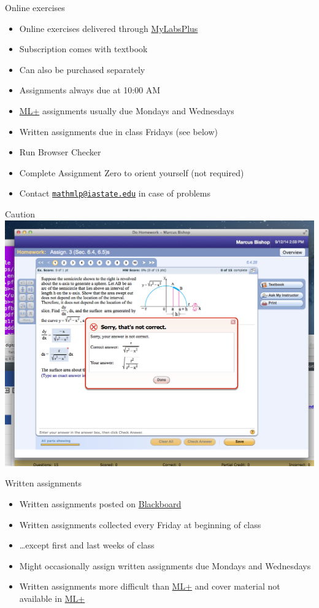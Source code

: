 \documentclass[xcolor=dvipsnames]{beamer}
\theoremstyle{definition}
\begin{document}
\begin{frame}{Online exercises}
\begin{itemize}
\item Online exercises delivered through
\href{http://iastate.mylabsplus.com}{\color{blue} MyLabsPlus}
\item Subscription comes with textbook
\item Can also be purchased separately
\item Assignments always due at 10:00 AM
\item 
\href{http://iastate.mylabsplus.com}{\color{blue}ML+}
assignments usually due Mondays and Wednesdays
\item Written assignments due in class Fridays (see below)
\item Run Browser Checker
\item Complete Assignment Zero to orient yourself (not required)
\item Contact
\href{mailto://mathmlp@iastate.edu}{\color{blue}\tt mathmlp@iastate.edu}
in case of problems
\end{itemize}
\end{frame}

\begin{frame}{Caution}
\includegraphics[scale=.4]{MLPError}
\end{frame}

\begin{frame}{Written assignments}
\begin{itemize}
\item Written assignments posted on
\href{https://bb.its.iastate.edu}{\color{blue} Blackboard}
\item Written assignments collected \alert{every Friday}
at \alert{beginning} of class
\item \dots except first and last weeks of class
\item Might occasionally assign written assignments
due Mondays and Wednesdays
\item Written assignments more difficult than 
\href{http://iastate.mylabsplus.com}{\color{blue}ML+}
and cover material not available in
\href{http://iastate.mylabsplus.com}{\color{blue}ML+}
\end{itemize}
\end{frame}
\end{document}
